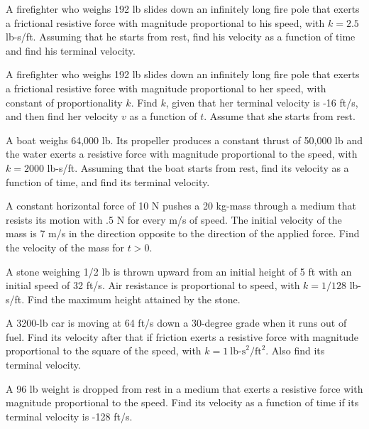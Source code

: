 \begin{exerciselist}
  \item\label{exer:4.3.1} A firefighter who weighs 192 lb slides down an infinitely long fire pole
        that exerts a frictional resistive force with magnitude proportional to his speed, with
        $k=2.5$ lb-s/ft. Assuming that he starts from rest, find his velocity as a function of time
        and find his terminal velocity.

  \item\label{exer:4.3.2} A firefighter who weighs 192 lb slides down an infinitely long fire pole
        that exerts a frictional resistive force with magnitude proportional to her speed, with
        constant of proportionality $k$. Find $k$, given that her terminal velocity is -16 ft/s, and
        then find her velocity $v$ as a function of $t$. Assume that she starts from rest.

  \item\label{exer:4.3.3} A boat weighs 64,000 lb. Its propeller produces a constant thrust of
        50,000 lb and the water exerts a resistive force with magnitude proportional to the speed,
        with $k=2000$ lb-s/ft. Assuming that the boat starts from rest, find its velocity as a
        function of time, and find its terminal velocity.

  \item\label{exer:4.3.4} A constant horizontal force of 10 N pushes a 20 kg-mass through a medium
        that resists its motion with .5 N for every m/s of speed. The initial velocity of the mass
        is 7 m/s in the direction opposite to the direction of the applied force. Find the velocity
        of the mass for $t>0$.

  \item\label{exer:4.3.5} A stone weighing 1/2 lb is thrown upward from an initial height of 5 ft
        with an initial speed of 32 ft/s. Air resistance is proportional to speed, with $k=1/128$
        lb-s/ft. Find the maximum height attained by the stone.

  \item\label{exer:4.3.6} A 3200-lb car is moving at 64 ft/s down a 30-degree grade when it runs out
        of fuel. Find its velocity after that if friction exerts a resistive force with magnitude
        proportional to the square of the speed, with $k=1\ \mbox{lb-s}^{2}/\mbox{ft}^{2}$. Also
        find its terminal velocity.

  \item\label{exer:4.3.7} A 96 lb weight is dropped from rest in a medium that exerts a resistive
        force with magnitude proportional to the speed. Find its velocity as a function of time if
        its terminal velocity is -128 ft/s.


\end{exerciselist}

